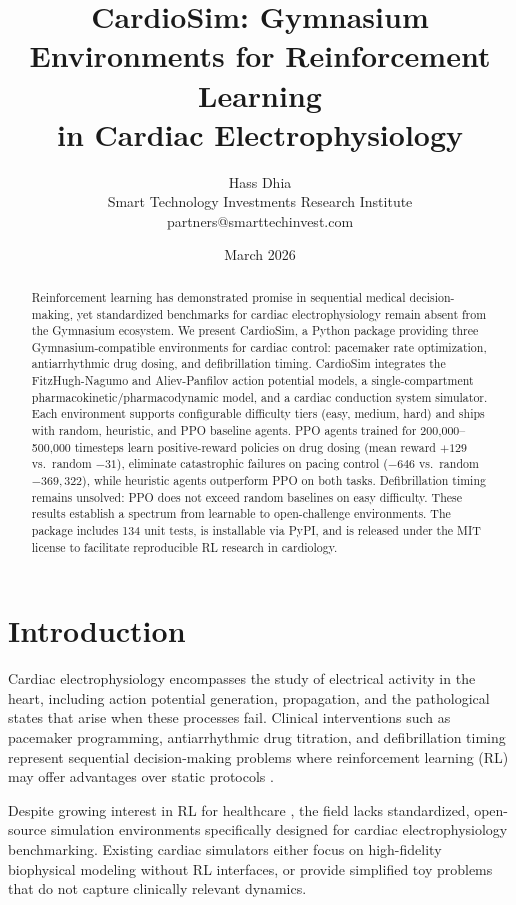 \documentclass[11pt,a4paper]{article}
\title{CardioSim: Gymnasium Environments for Reinforcement Learning\\in Cardiac Electrophysiology}
\author{Hass Dhia\\Smart Technology Investments Research Institute\\partners@smarttechinvest.com}
\date{March 2026}
\begin{document}
\maketitle

\begin{abstract}
Reinforcement learning has demonstrated promise in sequential medical decision-making, yet standardized benchmarks for cardiac electrophysiology remain absent from the Gymnasium ecosystem. We present CardioSim, a Python package providing three Gymnasium-compatible environments for cardiac control: pacemaker rate optimization, antiarrhythmic drug dosing, and defibrillation timing. CardioSim integrates the FitzHugh-Nagumo and Aliev-Panfilov action potential models, a single-compartment pharmacokinetic/pharmacodynamic model, and a cardiac conduction system simulator. Each environment supports configurable difficulty tiers (easy, medium, hard) and ships with random, heuristic, and PPO baseline agents. PPO agents trained for 200,000--500,000 timesteps learn positive-reward policies on drug dosing (mean reward $+129$ vs.\ random $-31$), eliminate catastrophic failures on pacing control ($-646$ vs.\ random $-369{,}322$), while heuristic agents outperform PPO on both tasks. Defibrillation timing remains unsolved: PPO does not exceed random baselines on easy difficulty. These results establish a spectrum from learnable to open-challenge environments. The package includes 134 unit tests, is installable via PyPI, and is released under the MIT license to facilitate reproducible RL research in cardiology.
\end{abstract}

\section{Introduction}

Cardiac electrophysiology encompasses the study of electrical activity in the heart, including action potential generation, propagation, and the pathological states that arise when these processes fail. Clinical interventions such as pacemaker programming, antiarrhythmic drug titration, and defibrillation timing represent sequential decision-making problems where reinforcement learning (RL) may offer advantages over static protocols \citep{mcnamara2025safe, jiang2024reward}.

Despite growing interest in RL for healthcare \citep{liu2022optimizing, tosca2024model}, the field lacks standardized, open-source simulation environments specifically designed for cardiac electrophysiology benchmarking. Existing cardiac simulators either focus on high-fidelity biophysical modeling without RL interfaces, or provide simplified toy problems that do not capture clinically relevant dynamics.
\end{document}
